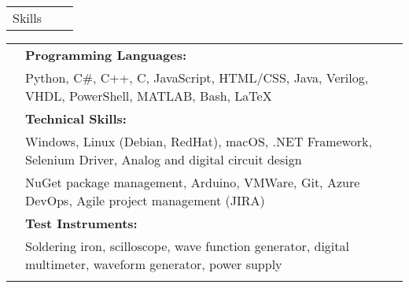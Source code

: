 \documentclass[letterpaper,10pt,oneside]{article}
\begin{document}
 \noindent \begin{tabularx}{\linewidth}{@{} l l R } 
     \Large{Skills}\\
 \end{tabularx}
 \noindent \begin{tabularx}{\linewidth}{@{} l l l }
     &\textbf{Programming Languages:}\\
     &Python, C\#, C++, C, JavaScript, HTML/CSS, Java, Verilog, VHDL, PowerShell, MATLAB, Bash, \LaTeX \\
     &\textbf{Technical Skills:}\\
     &Windows, Linux (Debian, RedHat), macOS, .NET Framework, Selenium Driver, Analog and digital circuit design\\
     &NuGet package management, Arduino, VMWare, Git, Azure DevOps, Agile project management (JIRA)\\
     &\textbf{Test Instruments:}\\
     &Soldering iron, scilloscope, wave function generator, digital multimeter, waveform generator, power supply\\
     \\
 \end{tabularx}
\end{document}
